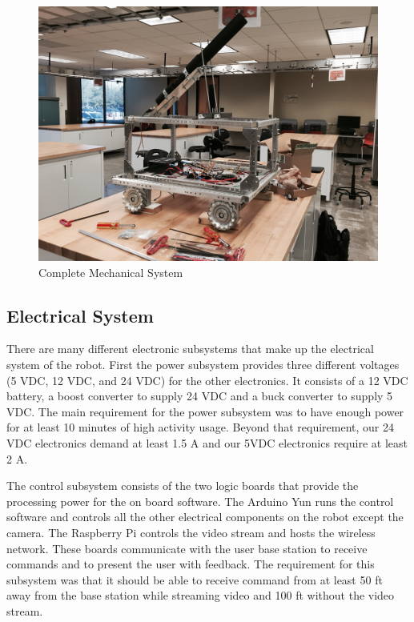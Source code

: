 \documentclass[letterpaper,12pt]{article}
\begin{document}
\begin{figure}[h!]
  \centering
  \includegraphics[width=15cm]{./pics/chassis/robot.jpg}
  \caption{Complete Mechanical System}
  \label{fig:mech_system}
\end{figure}

\subsection{Electrical System}
There are many different electronic subsystems that make up the electrical
system of the robot. First the power subsystem provides three different
voltages (5 VDC,  12 VDC, and 24 VDC) for the other electronics. It consists of
a 12 VDC battery, a boost converter to supply 24 VDC and a buck converter to
supply 5 VDC. The main requirement for the power subsystem was to have enough
power for at least 10 minutes of high activity usage. Beyond that requirement,
our 24 VDC electronics demand at least 1.5 A and our 5VDC electronics require
at least 2 A.

The control subsystem consists of the two logic boards that provide the
processing power for the on board software. The Arduino Yun runs the control
software and controls all the other electrical components on the robot except
the camera. The Raspberry Pi controls the video stream and hosts the wireless
network. These boards communicate with the user base station to receive
commands and to present the user with feedback. The requirement for this
subsystem was that it should be able to receive command from at least 50 ft
away from the base station while streaming video and 100 ft without the video
stream.
\end{document}
